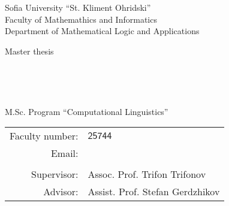 \documentclass[main.tex]{subfiles}
\begin{document}
\begin{center}
    Sofia University ``St. Kliment Ohridski'' \\
    Faculty of Mathemathics and Informatics \\
    Department of Mathematical Logic and Applications
    \vspace{4cm}

    {\LARGE Master thesis} \\

    \vspace{1cm}

    {\huge \thetitle} \\

    \vspace{2cm}

    {\LARGE \theauthor} \\

    \vspace{15mm}

    {\large M.Sc. Program ``Computational Linguistics''} \\

    \vspace{3mm}

    \begin{tabular}{r l}
        Faculty number: & $\mathsf{25744}$ \\
        Email: & \code{\theemail} \\

    \vspace{1cm} \\
        \large Supervisor: & \large Assoc. Prof. Trifon Trifonov \\
        \large Advisor: & \large Assist. Prof. Stefan Gerdzhikov \\
    \end{tabular}

    \vspace{4cm}

    {\large \thedate}
\end{center}
\thispagestyle{empty}

\pagebreak
\printtoc
\pagebreak
\end{document}
